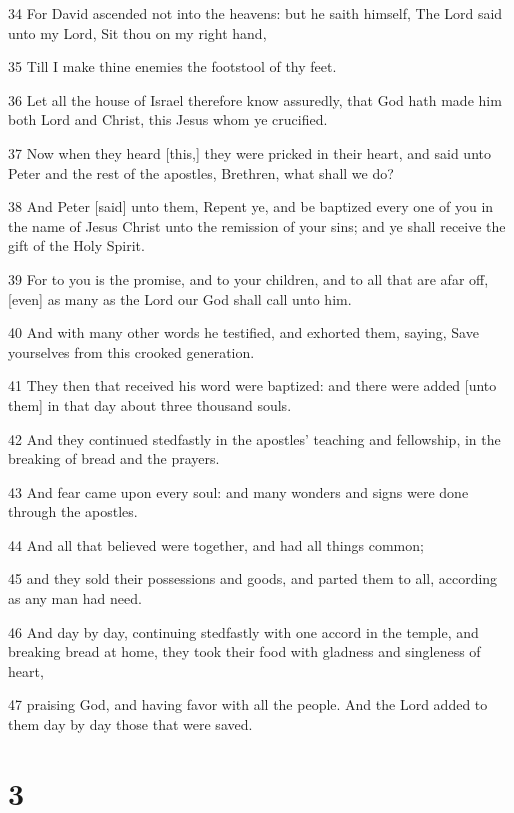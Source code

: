 \par 34 For David ascended not into the heavens: but he saith himself, The Lord said unto my Lord, Sit thou on my right hand,
\par 35 Till I make thine enemies the footstool of thy feet.
\par 36 Let all the house of Israel therefore know assuredly, that God hath made him both Lord and Christ, this Jesus whom ye crucified.
\par 37 Now when they heard [this,] they were pricked in their heart, and said unto Peter and the rest of the apostles, Brethren, what shall we do?
\par 38 And Peter [said] unto them, Repent ye, and be baptized every one of you in the name of Jesus Christ unto the remission of your sins; and ye shall receive the gift of the Holy Spirit.
\par 39 For to you is the promise, and to your children, and to all that are afar off, [even] as many as the Lord our God shall call unto him.
\par 40 And with many other words he testified, and exhorted them, saying, Save yourselves from this crooked generation.
\par 41 They then that received his word were baptized: and there were added [unto them] in that day about three thousand souls.
\par 42 And they continued stedfastly in the apostles' teaching and fellowship, in the breaking of bread and the prayers.
\par 43 And fear came upon every soul: and many wonders and signs were done through the apostles.
\par 44 And all that believed were together, and had all things common;
\par 45 and they sold their possessions and goods, and parted them to all, according as any man had need.
\par 46 And day by day, continuing stedfastly with one accord in the temple, and breaking bread at home, they took their food with gladness and singleness of heart,
\par 47 praising God, and having favor with all the people. And the Lord added to them day by day those that were saved.

\chapter{3}

